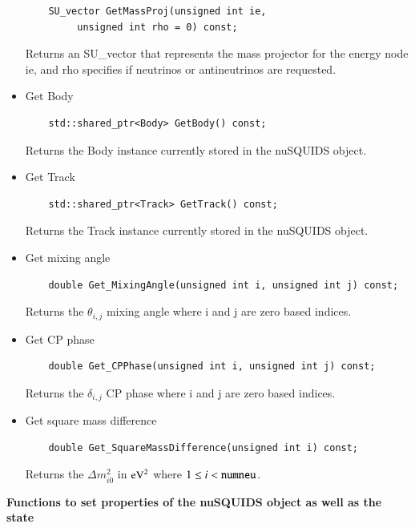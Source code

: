 \documentclass[3p,12pt]{elsarticle}
\newcommand{\ttf}{\ttfamily}
\begin{document}
\begin{itemize}
\begin{lstlisting}
    SU_vector GetMassProj(unsigned int ie,
         unsigned int rho = 0) const;
  \end{lstlisting}
  Returns an {\ttf SU\_vector} that represents the mass projector for the energy node {\ttf ie}, and 
  {\ttf rho} specifies if neutrinos or antineutrinos are requested.
  \item Get {\ttfamily Body}
  \begin{lstlisting}
    std::shared_ptr<Body> GetBody() const;
  \end{lstlisting}
  Returns the {\ttf Body} instance currently stored in the {\ttf nuSQUIDS} object.
  \item Get {\ttfamily Track}
  \begin{lstlisting}
    std::shared_ptr<Track> GetTrack() const;
  \end{lstlisting}
  Returns the {\ttf Track} instance currently stored in the {\ttf nuSQUIDS} object.
  \item Get mixing angle
  \begin{lstlisting}
    double Get_MixingAngle(unsigned int i, unsigned int j) const;
  \end{lstlisting}
  Returns the $\theta_{i,j}$ mixing angle where {\ttf i} and {\ttf j} are zero based indices.
  \item Get CP phase
  \begin{lstlisting}
    double Get_CPPhase(unsigned int i, unsigned int j) const;
  \end{lstlisting}
  Returns the $\delta_{i,j}$ CP phase where {\ttf i} and {\ttf j} are zero based indices.
  \item Get square mass difference
  \begin{lstlisting}
    double Get_SquareMassDifference(unsigned int i) const;
  \end{lstlisting}
  Returns the $\Delta m^2_{i0}$ in ${\rm eV}^2$ where $1\le i < {\rm \tt numneu}$.
  \end{itemize}
  
\textbf{Functions to set properties of the nuSQUIDS object as well as the state}
\end{document}
